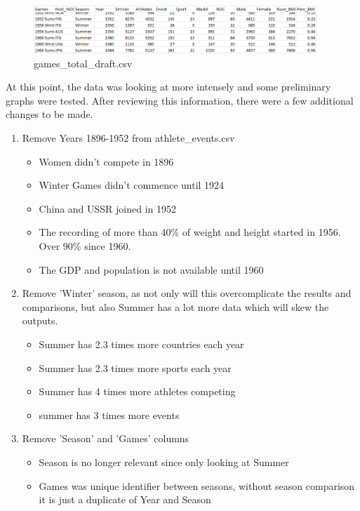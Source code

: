 \documentclass[a4 paper, 12pt]{article}
\begin{document}
        \begin{figure} [H]
            \centering
            \includegraphics[width=0.95\textwidth, frame]
                {./images/data/games_draft.png}     
            \caption{games\_total\_draft.csv}               
        \end{figure} 

    At this point, the data was looking at more intensely and some preliminary graphs were tested. After reviewing this information, there were a few additional changes to be made. 
        \begin{enumerate}
            \item Remove Years 1896-1952 from athlete\_events.csv
                \begin{itemize}
                    \item Women didn't compete in 1896
                    \item Winter Games didn't commence until 1924
                    \item China and USSR joined in 1952
                    \item The recording of more than 40\% of weight and height started in 1956. Over 90\% since 1960.
                    \item The GDP and population is not available until 1960
                \end{itemize}
            \item Remove 'Winter' season, as not only will this overcomplicate the results and comparisons, but also Summer has a lot more data which will skew the outputs.
                \begin{itemize}
                    \item Summer has 2.3 times more countries each year
                    \item Summer has 2.3 times more sports each year
                    \item Summer has 4 times more athletes competing
                    \item summer has 3 times more events
                \end{itemize}
            \item Remove 'Season' and 'Games' columns   
                \begin{itemize}
                    \item Season is no longer relevant since only looking at Summer
                    \item Games was unique identifier between seasons, without season comparison it is just a duplicate of Year and Season
                \end{itemize}             
        \end{enumerate}
\end{document}
